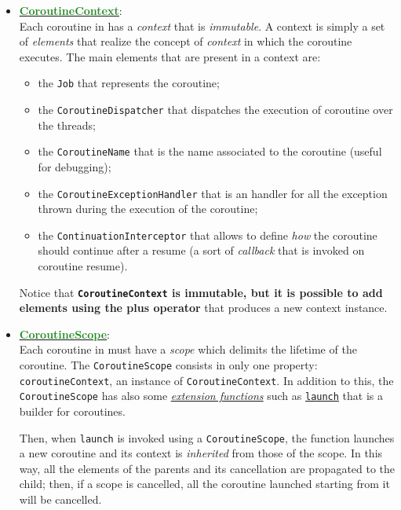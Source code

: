 \begin{itemize}
	\item \href{https://kotlinlang.org/api/latest/jvm/stdlib/kotlin.coroutines/-coroutine-context/}{\underline{\textbf{\textcolor{ForestGreen}{CoroutineContext}}}}:\\
	Each coroutine in \Kotlin has a \textit{context} that is \textit{immutable}. A context is simply a set of \textit{elements} that realize the concept of \textit{context} in which the coroutine executes.
	The main elements that are present in a context are:
	\begin{itemize}
		\item the \texttt{Job} that represents the coroutine;
		\item the \texttt{CoroutineDispatcher} that dispatches the execution of coroutine over the threads;
		\item the \texttt{CoroutineName} that is the name associated to the coroutine (useful for debugging);
		\item the \texttt{CoroutineExceptionHandler} that is an handler for all the exception thrown during the execution of the coroutine;
		\item the \texttt{ContinuationInterceptor} that allows to define \textit{how} the coroutine should continue after a resume (a sort of \textit{callback} that is invoked on coroutine resume).
	\end{itemize}
	
	Notice that \textbf{\texttt{CoroutineContext} is immutable, but it is possible to add elements using the plus operator} that produces a new context instance.
	
	\item \href{https://kotlinlang.org/api/kotlinx.coroutines/kotlinx-coroutines-core/kotlinx.coroutines/-coroutine-scope/}{\underline{\textbf{\textcolor{ForestGreen}{CoroutineScope}}}}:\\
	Each coroutine in \Kotlin must have a \textit{scope} which delimits the lifetime of the coroutine. The \texttt{CoroutineScope} consists in only one property: \texttt{coroutineContext}, an instance of \texttt{CoroutineContext}.
	In addition to this, the \texttt{CoroutineScope} has also some \href{https://kotlinlang.org/docs/extensions.html}{\textit{extension functions}} such as \href{https://kotlinlang.org/api/kotlinx.coroutines/kotlinx-coroutines-core/kotlinx.coroutines/launch.html}{\texttt{launch}} that is a builder for coroutines.
	
	Then, when \texttt{launch} is invoked using a \texttt{CoroutineScope}, the function launches a new coroutine and its context is \textit{inherited} from those of the scope.
	In this way, all the elements of the parents and its cancellation are propagated to the child; then, if a scope is cancelled, all the coroutine launched starting from it will be cancelled.
\end{itemize}

